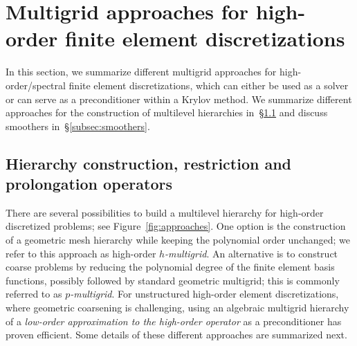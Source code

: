\documentclass[times]{nlaauth}
\newcommand{\todo}[1]{\textcolor{red}{ #1}}
\begin{document}







\section{Multigrid approaches for high-order finite element discretizations}
\label{sec:approaches}

In this section, we summarize different multigrid approaches
for high-order/spectral finite element
discretizations, which can either be used as
a solver or can serve as a preconditioner within a Krylov method. We
summarize different approaches for the construction of
multilevel hierarchies in~\S\ref{subsec:hierarchy} and discuss
smoothers in~\S\ref{subsec:smoothers}.

\subsection{Hierarchy construction, restriction and prolongation operators}\label{subsec:hierarchy}
There are several possibilities to build a multilevel hierarchy for
high-order discretized problems; see Figure~\ref{fig:approaches}. One
option is the construction of a geometric mesh hierarchy while keeping
the polynomial order unchanged; we refer to this approach as
high-order \emph{$h$-multigrid}. An alternative is to construct coarse
problems by reducing the polynomial degree of the finite element basis
functions, possibly followed by standard geometric multigrid; this is
commonly referred to as \emph{$p$-multigrid}. For unstructured
high-order element discretizations, where geometric coarsening is
challenging, using an algebraic multigrid hierarchy of a
\emph{low-order approximation to the high-order operator} as a
preconditioner has proven efficient. Some details of
these different approaches are summarized next.
\end{document}
